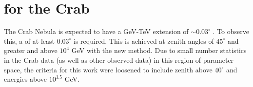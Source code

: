 \documentclass[main.tex]{subfiles}
\begin{document}



\section{\rse for the Crab}

The Crab Nebula is expected to have a GeV-TeV extension of $\sim 0.03^\circ$ \cite{Fermi_LAT_Crab_extension}\cite{HESS_Crab_extension}. To observe this, a \rse of at least $0.03^\circ$ is required. This is achieved at zenith angles of $45^\circ$ and greater and above $10^{4}$ GeV with the new \disp method. Due to small number statistics in the Crab data (as well as other observed data) in this region of parameter space, the criteria for this work were loosened to include zenith above $40^\circ$ and energies above $10^{3.5}$ GeV.
\end{document}
